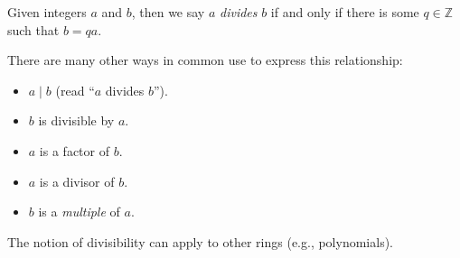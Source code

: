 \documentclass[12pt]{article}
\begin{document}
Given integers $a$ and $b$, then we say $a$ \emph{divides} $b$ if and only if there is some $q \in \mathbb{Z}$ such that $b=qa$.

There are many other ways in common use to express this relationship:

\begin{itemize}
\item $a\mid b$ (read ``$a$ divides $b$'').
\item $b$ is divisible by $a$.
\item $a$ is a factor of $b$.
\item $a$ is a divisor of $b$.
\item $b$ is a \emph{multiple} of $a$.
\end{itemize}

The notion of divisibility can apply to other rings (e.g., polynomials).
\end{document}
